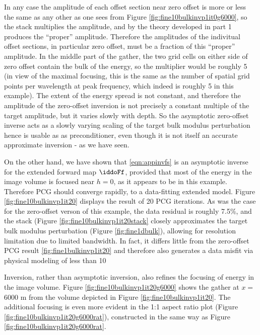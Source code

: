 In any case the amplitude of each offset section near zero offset is
more or less the same as any other as one sees from Figure
\ref{fig:fine10bulkinvp1it0g6000}, so the stack multiplies the
amplitude, and by the theory developed in part 1 produces the
``proper'' amplitude. Therefore the amplitudes of the indivitual
offset sections, in particular zero offset, must be a fraction of this
``proper'' amplitude. In the middle part of the gather, the two grid
cells on either side of zero offset contain the bulk of the energy, so
the multiplier would be roughly 5 (in view of the maximal focusing,
this is the same as the number of spatial grid points per wavelength
at peak frequency, which indeed is roughly 5 in this example). The
extent of the energy spread is not constant, and therefore the
amplitude of the zero-offset inversion is not precisely a constant
multiple of the target amplitude, but it varies slowly with depth. So
the asymptotic zero-offset inverse acts as a slowly varying scaling of
the target bulk modulus perturbation hence is usable as as
preconditioner, even though it is not itself an accurate approximate
inversion - as we have seen.

On the other hand, we have shown that \ref{eqn:appinvfs} is an
asymptotic inverse for the extended forward map $\iddoFf$, provided
that most of the energy in the image volume is focused near $h=0$, as
it appears to be in this example. Therefore PCG should converge
rapidly, to a data-fitting extended model. Figure
\ref{fig:fine10bulkinvp1it20} displays the result of 20 PCG
iterations. As was the case for the zero-offset verson of this
example, the data residual is roughly 7.5\%, and the stack (Figure
\ref{fig:fine10bulkinvp1it20stack} closely approximates the target
bulk modulus perturbation (Figure \ref{fig:fine1dbulk}), allowing for
resolution limitation due to limited bandwidth. In fact, it differs
little from the zero-offset PCG result \ref{fig:fine1bulkinvp1it20}
and therefore also generates a data misfit via physical modeling of
less than 10%



Inversion, rather than asymptotic inversion, also refines the focusing
of energy in the image volume. Figure
\ref{fig:fine10bulkinvp1it20g6000} shows the gather at $x=$ 6000 m
from the volume depicted in Figure \ref{fig:fine10bulkinvp1it20}. The
additional focusing is even more evident in the 1:1 aspect ratio plot
(Figure \ref{fig:fine10bulkinvp1it20g6000rat}), constructed in the same
way as Figure \ref{fig:fine10bulkinvp1it20g6000rat}.

